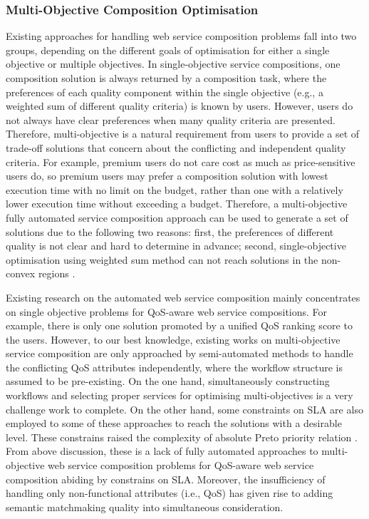 \subsubsection{Multi-Objective Composition Optimisation}
Existing approaches for handling web service composition problems fall into two groups, depending on the different goals of optimisation for either a single objective or multiple objectives. In single-objective service compositions, one composition solution is always returned by a composition task, where the preferences of each quality component within the single objective (e.g., a weighted sum of different quality criteria) is known by users. However, users do not always have clear preferences when many quality criteria are presented. Therefore, multi-objective is a natural requirement from users to provide a set of trade-off solutions that concern about the conflicting and independent quality criteria. For example, premium users do not care cost as much as price-sensitive users do, so premium users may prefer a composition solution with lowest execution time with no limit on the budget,  rather than one with a relatively lower execution time without exceeding a budget. Therefore, a multi-objective  fully automated service composition approach can be used to generate a set of solutions due to the following two reasons: first, the preferences of different quality is not clear and hard to determine in advance; second, single-objective optimisation using weighted sum method can not reach solutions in the non-convex regions \cite{kim2006adaptive}.  

Existing research on the automated web service composition mainly concentrates on single objective problems for QoS-aware web service compositions. For example, there is only one solution promoted by a unified QoS ranking score to the users. However, to our best knowledge, existing works on multi-objective service composition \cite{liu2005dynamic,wada2012e3,yao2009qos,yin2014hybrid} are only approached by semi-automated methods to handle the conflicting QoS attributes independently, where the workflow structure is assumed to be pre-existing. On the one hand, simultaneously constructing workflows and selecting proper services for optimising multi-objectives is a very challenge work to complete. On the other hand, some constraints on SLA are also employed to some of these approaches to reach the solutions with a desirable level. These constrains raised the complexity of absolute Preto priority relation \cite{garey1979guide}. From above discussion, these is a lack of fully automated approaches to multi-objective web service composition problems for QoS-aware web service composition abiding by constrains on SLA. Moreover, the insufficiency of handling only non-functional attributes (i.e., QoS) has given rise to adding semantic matchmaking quality into simultaneous consideration.

